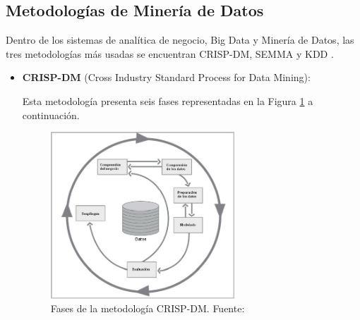 \clearpage

\subsection{Metodologías de Minería de Datos}

Dentro de los sistemas de analítica de negocio, Big Data y Minería de Datos, las tres metodologías más usadas se encuentran CRISP-DM, SEMMA y KDD \parencite{tec_braulio2015metodologiasdm}.
\begin{itemize}
	\item \textbf{CRISP-DM} (Cross Industry Standard Process for Data Mining):
	
	Esta metodología presenta seis fases representadas en la Figura \ref{2:fig7} a continuación.
	\begin{figure}[h]
		\begin{center}
			\includegraphics[width=0.65\textwidth]{2/figures/crispdm.jpg}
			\caption[Fases de la metodología CRISP-DM]{Fases de la metodología CRISP-DM. Fuente: \cite{tec_braulio2015metodologiasdm}}
			\label{2:fig7}
		\end{center}
	\end{figure}
		

\end{itemize}
